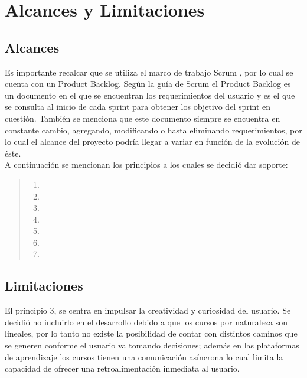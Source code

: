 \section{Alcances y Limitaciones}
\label{sec:alcancesLimitaciones}

\subsection{Alcances}
\label{subsec:alcances}

Es importante recalcar que se utiliza el marco de trabajo Scrum \cite{scrum1}, por lo cual se cuenta con un Product Backlog. Según la guía de Scrum \cite{scrum2} el Product Backlog es un documento en el que se encuentran los requerimientos del usuario y es el que se consulta al inicio de cada sprint para obtener los objetivo del sprint en cuestión. También se menciona que este documento siempre se encuentra en constante cambio, agregando, modificando o hasta eliminando requerimientos, por lo cual el alcance del proyecto podría llegar a variar en función de la evolución de éste.\\

    A continuación se mencionan los principios a los cuales se decidió dar soporte:
     
        \begin{quote}
        \begin{enumerate}
            \item \principioI
            \item \principioII
            \setcounter{enumi}{3}
            \item \principioIV
            \item \principioV
            \item \principioVI
            \item \principioVII
            \item \principioVIII
        \end{enumerate}
        \end{quote}

\subsection{Limitaciones}
\label{subsec:limitaciones}

     
     \noindent El principio 3, \principioIII se centra en impulsar la creatividad y curiosidad del usuario. Se decidió no incluirlo en el desarrollo debido a que los cursos por naturaleza son lineales, por lo tanto no existe la posibilidad de contar con distintos caminos que se generen conforme el usuario va tomando decisiones; además en las plataformas de aprendizaje los cursos tienen una comunicación asíncrona lo cual limita la capacidad de ofrecer una retroalimentación inmediata al usuario. %
